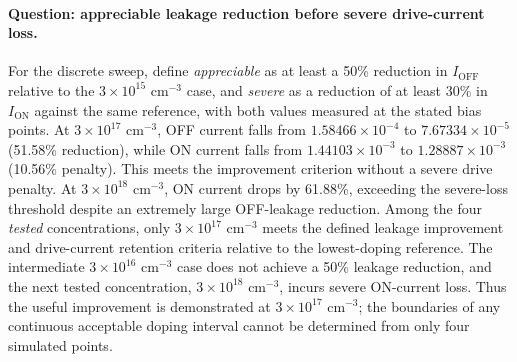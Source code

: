 \paragraph{Question: appreciable leakage reduction before severe drive-current loss.}
For the discrete sweep, define \emph{appreciable} as at least
a 50\% reduction in $I_{\mathrm{OFF}}$ relative to the
$3\times10^{15}$ cm$^{-3}$ case,
and \emph{severe} as a reduction of at least 30\%
in $I_{\mathrm{ON}}$ against the same reference,
with both values measured at the stated bias points.
At $3\times10^{17}$ cm$^{-3}$, OFF current falls from
$1.58466\times10^{-4}$ to $7.67334\times10^{-5}$
(51.58\% reduction), while ON current falls from
$1.44103\times10^{-3}$ to $1.28887\times10^{-3}$
(10.56\% penalty). This meets the improvement
criterion without a severe drive penalty.
At $3\times10^{18}$ cm$^{-3}$, ON current drops by
61.88\%, exceeding the severe-loss threshold despite
an extremely large OFF-leakage reduction.
Among the four \emph{tested} concentrations, only
$3\times10^{17}$ cm$^{-3}$ meets the defined leakage
improvement and drive-current retention criteria relative
to the lowest-doping reference. The intermediate
$3\times10^{16}$ cm$^{-3}$ case does not achieve a 50\%
leakage reduction, and the next tested concentration,
$3\times10^{18}$ cm$^{-3}$, incurs severe ON-current loss.
Thus the useful improvement is demonstrated at
$3\times10^{17}$ cm$^{-3}$; the boundaries of any continuous
acceptable doping interval cannot be determined from
only four simulated points.
